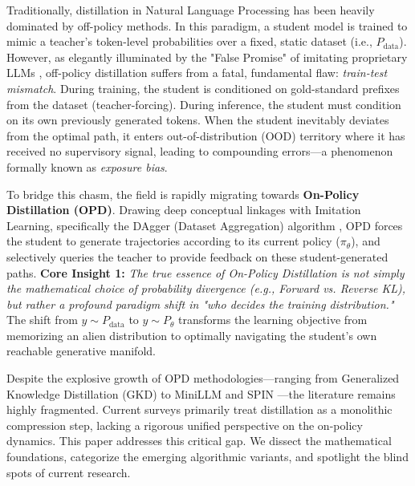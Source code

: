 \documentclass{article}
\newcommand{\ptheta}{P_\theta}
\newcommand{\pdata}{P_{\mathrm{data}}}
\begin{document}
Traditionally, distillation in Natural Language Processing has been heavily dominated by off-policy methods. In this paradigm, a student model is trained to mimic a teacher's token-level probabilities over a fixed, static dataset (i.e., $\pdata$). However, as elegantly illuminated by the "False Promise" of imitating proprietary LLMs \citep{2305.15717}, off-policy distillation suffers from a fatal, fundamental flaw: \textit{train-test mismatch}. During training, the student is conditioned on gold-standard prefixes from the dataset (teacher-forcing). During inference, the student must condition on its own previously generated tokens. When the student inevitably deviates from the optimal path, it enters out-of-distribution (OOD) territory where it has received no supervisory signal, leading to compounding errors—a phenomenon formally known as \textit{exposure bias}. 

To bridge this chasm, the field is rapidly migrating towards \textbf{On-Policy Distillation (OPD)}. Drawing deep conceptual linkages with Imitation Learning, specifically the DAgger (Dataset Aggregation) algorithm \citep{ross2011reduction}, OPD forces the student to generate trajectories according to its current policy ($\pi_\theta$), and selectively queries the teacher to provide feedback on these student-generated paths. 
\textbf{Core Insight 1:} \textit{The true essence of On-Policy Distillation is not simply the mathematical choice of probability divergence (e.g., Forward vs. Reverse KL), but rather a profound paradigm shift in "who decides the training distribution."} The shift from $y \sim \pdata$ to $y \sim \ptheta$ transforms the learning objective from memorizing an alien distribution to optimally navigating the student's own reachable generative manifold.

Despite the explosive growth of OPD methodologies—ranging from Generalized Knowledge Distillation (GKD) \citep{2306.13649} to MiniLLM \citep{2306.08543} and SPIN \citep{2401.01335}—the literature remains highly fragmented. Current surveys \citep{2402.13116} primarily treat distillation as a monolithic compression step, lacking a rigorous unified perspective on the on-policy dynamics. This paper addresses this critical gap. We dissect the mathematical foundations, categorize the emerging algorithmic variants, and spotlight the blind spots of current research.
\end{document}
